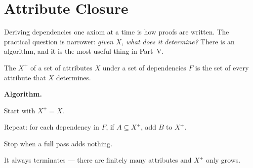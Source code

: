 \section{Attribute Closure}

Deriving dependencies one axiom at a time is how proofs are written. The
practical question is narrower: \emph{given $X$, what does it determine?} There
is an algorithm, and it is the most useful thing in Part~V.

\begin{definitionbox}
The  $X^{+}$ of a set of attributes $X$ under a set of
dependencies $F$ is the set of every attribute that $X$ determines.

\smallskip
\textbf{Algorithm.}
\begin{tightnum}
  \item Start with $X^{+} = X$.
  \item Repeat: for each dependency  in $F$, if $A \subseteq X^{+}$,
        add $B$ to $X^{+}$.
  \item Stop when a full pass adds nothing.
\end{tightnum}

\smallskip
It always terminates --- there are finitely many attributes and $X^{+}$ only
grows.
\end{definitionbox}


